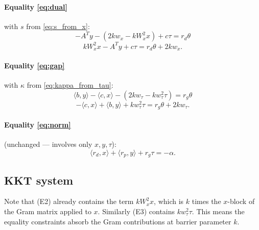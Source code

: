 \documentclass{article}
\newcommand{\ip}[2]{\langle #1, #2 \rangle}
\begin{document}
\paragraph{Equality \eqref{eq:dual}} with $s$ from \eqref{eq:s_from_x}:
\[
  -A^T y - (2k w_x - k W_x^2 x) + c\tau = r_d \theta
\]
\begin{equation}
  k W_x^2 x - A^T y + c\tau = r_d \theta + 2k w_x. \tag{E2}
\end{equation}

\paragraph{Equality \eqref{eq:gap}} with $\kappa$ from \eqref{eq:kappa_from_tau}:
\[
  \ip{b}{y} - \ip{c}{x} - (2k w_\tau - k w_\tau^2 \tau) = r_g \theta
\]
\begin{equation}
  -\ip{c}{x} + \ip{b}{y} + k w_\tau^2 \tau = r_g \theta + 2k w_\tau. \tag{E3}
\end{equation}

\paragraph{Equality \eqref{eq:norm}} (unchanged --- involves only $x, y, \tau$):
\begin{equation}
  \ip{r_d}{x} + \ip{r_p}{y} + r_g \tau = -\alpha. \tag{E4}
\end{equation}

\subsection{KKT system}

Note that (E2) already contains the term $k W_x^2 x$, which is $k$ times the $x$-block of the Gram matrix applied to $x$. Similarly (E3) contains $k w_\tau^2 \tau$. This means the equality constraints absorb the Gram contributions at barrier parameter $k$.
\end{document}
